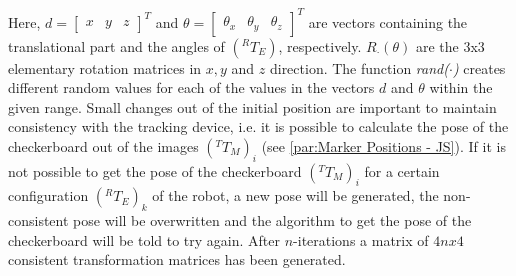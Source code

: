 \documentclass[conference]{IEEEtran}
\begin{document}
Here, \(d = \begin{bmatrix}x & y & z\end{bmatrix}^T\) and \(\theta = \begin{bmatrix}\theta_x & \theta_y & \theta_z\end{bmatrix}^T\) are vectors containing the translational part and the angles of \((^RT_E)\), respectively. \(R_{\cdot}(\theta)\) are the \(3\)x\(3\) elementary rotation matrices in \(x, y\) and \(z\) direction. The function \textit{rand(\(\cdot \))} creates different random values for each of the values in the vectors \(d\) and \(\theta\) within the given range. Small changes out of the initial position are important to maintain consistency with the tracking device, i.e. it is possible to calculate the pose of the checkerboard out of the images \((^TT_M)_i\) (see \ref{par:Marker Positions - JS}). If it is not possible to get the pose of the checkerboard \((^TT_M)_i\) for a certain configuration \((^RT_E)_k\) of the robot, a new pose will be generated, the non-consistent pose will be overwritten and the algorithm to get the pose of the checkerboard will be told to try again. After \(n\)-iterations a matrix of \(4n x 4\) consistent transformation matrices has been generated. 
\end{document}
